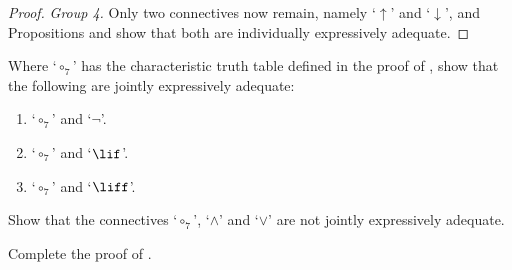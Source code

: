 \documentclass[../../../include/open-logic-section]{subfiles}
\begin{document}
\begin{thm}
\begin{proof}
		\emph{Group 4.} Only two connectives now remain, namely `$\uparrow$' and `$\downarrow$', and 	Propositions  and  show that both are individually expressively adequate.
		\end{proof}
	\end{thm}

\begin{prob}
 Where `$\circ_7$' has the characteristic truth table defined in the proof of , show that the following are jointly expressively adequate:
	\begin{enumerate}
		\item `$\circ_7$' and `$\lnot$'. %
		\item `$\circ_7$' and `$\lif$'. %
		\item `$\circ_7$' and `$\liff$'. %
	\end{enumerate}
\end{prob}

\begin{prob}
Show that the connectives `$\circ_7$', `$\land$' and `$\lor$' are not jointly expressively adequate.\\
\end{prob}

\begin{prob}
Complete the proof of .
\end{prob}

 
\end{document}
